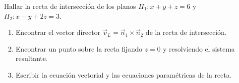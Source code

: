 Hallar la recta de intersección de los planos $\Pi_1: x + y + z = 6$ y $\Pi_2: x - y + 2z = 3$.
\begin{enumerate}
    \item Encontrar el vector director $\vec{v}_L = \vec{n}_1 \times \vec{n}_2$ de la recta de intersección.
    \item Encontrar un punto sobre la recta fijando $z = 0$ y resolviendo el sistema resultante.
    \item Escribir la ecuación vectorial y las ecuaciones paramétricas de la recta.
\end{enumerate}